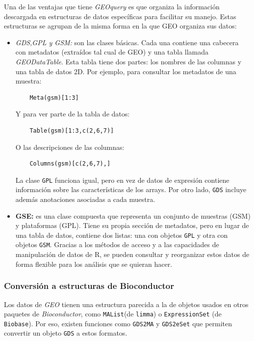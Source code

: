 Una de las ventajas que tiene \textit{GEOquery} es que organiza la información descargada en estructuras de datos específicas para facilitar su manejo. Estas
estructuras se agrupan de la misma forma en la que GEO organiza sus datos:

\begin{itemize}
    \item \textit{GDS,GPL y GSM:} son las clases básicas. Cada una contiene una cabecera con metadatos (extraídos tal cual de GEO) y una tabla llamada 
    \textit{GEODataTable}. Esta tabla tiene dos partes: los nombres de las columnas y una tabla de datos 2D. Por ejemplo, para consultar los metadatos de una
    muestra:
    \begin{verbatim}
    Meta(gsm)[1:3]
    \end{verbatim}

    Y para ver parte de la tabla de datos:

    \begin{verbatim}
    Table(gsm)[1:3,c(2,6,7)]
    \end{verbatim}

    O las descripciones de las columnas:

    \begin{verbatim}
    Columns(gsm)[c(2,6,7),]
    \end{verbatim}

    La clase \texttt{GPL} funciona igual, pero en vez de datos de expresión contiene información sobre las características de los arrays. Por otro lado, \texttt{GDS} 
    incluye además anotaciones asociadas a cada muestra.

    \item \textbf{GSE:} es una clase compuesta que representa un conjunto de muestras (GSM) y plataformas (GPL). Tiene su propia sección de metadatos, pero en 
    lugar de una tabla de datos, contiene dos listas: una con objetos \texttt{GPL} y otra con objetos \texttt{GSM}. Gracias a los métodos de acceso y a las capacidades 
    de manipulación de datos de R, se pueden consultar y reorganizar estos datos de forma flexible para los análisis que se quieran hacer.
\end{itemize}

\subsubsection{Conversión a estructuras de Bioconductor}

Los datos de \textit{GEO} tienen una estructura parecida a la de objetos usados en otros paquetes de \textit{Bioconductor}, como \texttt{MAList}(de \texttt{limma}) o 
\texttt{ExpressionSet} (de \texttt{Biobase}). Por eso, existen funciones como \texttt{GDS2MA} y \texttt{GDS2eSet} que permiten convertir un objeto \texttt{GDS} a estos 
formatos. \newline

